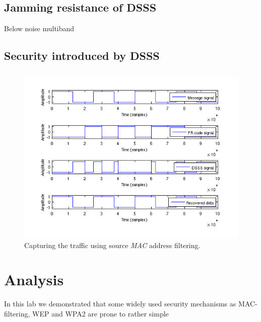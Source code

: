 \documentclass[12pt,a4paper]{article}
\begin{document}
		\subsection{Jamming resistance of DSSS}
			Below noise
			multiband
			
		\subsection{Security introduced by DSSS}
		
		\subsection{}
	
	
	\begin{figure}
		\includegraphics[width=\textwidth]{images/code_cl10_dl10.png}
		\caption{Capturing the traffic using source \emph{MAC} address filtering.}
		\label{wep:wireshark}
	\end{figure}
	
	\section{Analysis}
	In this lab we demonstrated that some widely used security mechanisms as MAC-filtering, WEP and WPA2 are prone to rather simple 
	
	
	
	
\end{document}

